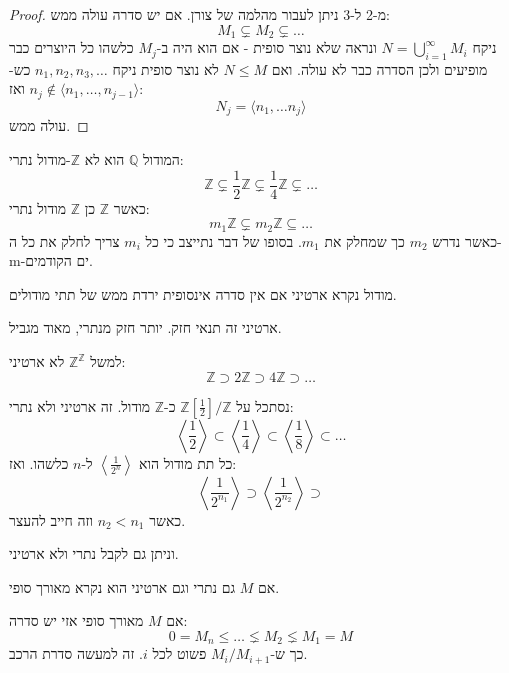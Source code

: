 \documentclass{tstextbook}
\begin{document}
\begin{proof}
מ-2 ל-3 ניתן לעבור מהלמה של צורן.
אם יש סדרה עולה ממש:
$$M_{1} \subsetneq M_{2} \subsetneq \dots$$
ניקח \(N=\bigcup_{i=1}^{\infty}M_{i}\) ונראה שלא נוצר סופית - אם הוא היה ב-\(M_{j}\) כלשהו כל היוצרים כבר מופיעים ולכן הסדרה כבר לא עולה. ואם \(N\leq M\) לא נוצר סופית ניקח \(n_{1},n_{2},n_{3},\dots\) כש-\(n_{j}\not\in \langle n_{1},\dots,n_{j-1} \rangle\) ואז:
$$N_{j}=\langle n_{1},\dots n_{j} \rangle $$
עולה ממש.

\end{proof}
\begin{example}
המודול \(\mathbb{Q}\) הוא לא \(\mathbb{Z}\)-מודול נתרי:
$$\mathbb{Z}\subsetneq \frac{1}{2}\mathbb{Z} \subsetneq \frac{1}{4}\mathbb{Z} \subsetneq \dots$$
כאשר \(\mathbb{Z}\) כן \(\mathbb{Z}\) מודול נתרי:
$$m_{1}\mathbb{Z} \subsetneq m_{2}\mathbb{Z} \subseteq \dots $$
כאשר נדרש \(m_{2}\) כך שמחלק את \(m_{1}\). בסופו של דבר נתייצב כי כל \(m_{i}\) צריך לחלק את כל ה-m-ים הקודמים.

\end{example}
\begin{definition}
מודול נקרא ארטיני אם אין סדרה אינסופית ירדת ממש של תתי מודולים.

\end{definition}
\begin{remark}
ארטיני זה תנאי חזק. יותר חזק מנתרי, מאוד מגביל.

\end{remark}
\begin{example}
למשל \(\mathbb{Z}^{\mathbb{Z}}\) לא ארטיני:
$$\mathbb{Z}\supset 2\mathbb{Z} \supset 4\mathbb{Z}\supset \dots$$

\end{example}
\begin{example}
נסתכל על \(\mathbb{Z}\left[ \frac{1}{2} \right] / \mathbb{Z}\) כ-\(\mathbb{Z}\) מודול. זה ארטיני ולא נתרי:
$$\left\langle  \frac{1}{2}  \right\rangle \subset \left\langle  \frac{1}{4}  \right\rangle \subset \left\langle  \frac{1}{8}  \right\rangle \subset \dots$$
כל תת מודול הוא \(\left\langle  \frac{1}{2^{n}}  \right\rangle\) ל-\(n\) כלשהו. ואז:
$$\left\langle  \frac{1}{2^{n_{1}}}  \right\rangle \supset \left\langle  \frac{1}{2^{n_{2}}}  \right\rangle\supset $$
כאשר \(n_{2}< n_{1}\) וזה חייב להעצר.

\end{example}
וניתן גם לקבל נתרי ולא ארטיני.

\begin{definition}
אם \(M\) גם נתרי וגם ארטיני הוא נקרא מאורך סופי.

\end{definition}
אם \(M\) מאורך סופי אזי יש סדרה:
$$0=M_{n}\leq  \dots \lneq M_{2} \lneq  M_{1}=M$$
כך ש-\(M_{i} / M_{i+1}\) פשוט לכל \(i\).  זה למעשה סדרת הרכב.
\end{document}
